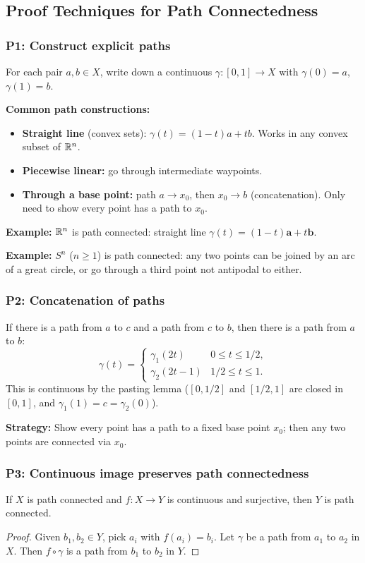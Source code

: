 \documentclass{article}
\begin{document}
\subsection{Proof Techniques for Path Connectedness}

\subsubsection*{P1: Construct explicit paths}
For each pair $a, b \in X$, write down a continuous $\gamma : [0,1] \to X$
with $\gamma(0) = a$, $\gamma(1) = b$.

\textbf{Common path constructions:}
\begin{itemize}
  \item \textbf{Straight line} (convex sets): $\gamma(t) = (1-t)a + tb$.
    Works in any convex subset of $\mathbb{R}^n$.
  \item \textbf{Piecewise linear:} go through intermediate waypoints.
  \item \textbf{Through a base point:} path $a \to x_0$, then $x_0 \to b$
    (concatenation). Only need to show every point has a path to $x_0$.
\end{itemize}

\textbf{Example:} $\mathbb{R}^n$ is path connected: straight line $\gamma(t) =
(1-t)\mathbf{a} + t\mathbf{b}$.

\textbf{Example:} $S^n$ ($n \ge 1$) is path connected: any two points
can be joined by an arc of a great circle, or go through a third point
not antipodal to either.

\subsubsection*{P2: Concatenation of paths}
If there is a path from $a$ to $c$ and a path from $c$ to $b$, then there
is a path from $a$ to $b$:
\[
  \gamma(t) =
  \begin{cases}
    \gamma_1(2t) & 0 \le t \le 1/2, \\
    \gamma_2(2t - 1) & 1/2 \le t \le 1.
  \end{cases}
\]
This is continuous by the pasting lemma ($[0,1/2]$ and $[1/2,1]$ are
closed in $[0,1]$, and $\gamma_1(1) = c = \gamma_2(0)$).

\textbf{Strategy:} Show every point has a path to a fixed base point
$x_0$; then any two points are connected via $x_0$.

\subsubsection*{P3: Continuous image preserves path connectedness}
\begin{proposition}
  If $X$ is path connected and $f : X \to Y$ is continuous and
  surjective, then $Y$ is path connected.
\end{proposition}
\begin{proof}
  Given $b_1, b_2 \in Y$, pick $a_i$ with $f(a_i) = b_i$. Let
  $\gamma$ be a path from $a_1$ to $a_2$ in $X$. Then $f \circ \gamma$
  is a path from $b_1$ to $b_2$ in $Y$.
\end{proof}
\end{document}

